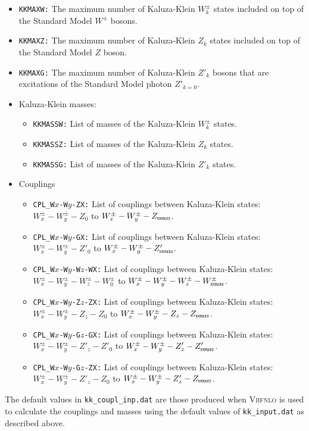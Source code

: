 \documentclass[english,12pt]{article}
\begin{document}
\begin{itemize}
 \item {\tt KKMAXW:} The maximum number of Kaluza-Klein $W^\pm_k$ states 
included on top of the Standard Model $W^\pm$ bosons.
 \item {\tt KKMAXZ:} The maximum number of Kaluza-Klein $Z_k$ states 
included on top of the Standard Model $Z$ boson.
 \item {\tt KKMAXG:} The maximum number of Kaluza-Klein $Z'_k$ bosons that are
excitations of the Standard Model photon $Z'_{k=0}$.
 \item Kaluza-Klein masses:
   \begin{itemize}
    \item {\tt KKMASSW:} List of masses of the Kaluza-Klein $W^{\pm}_{k}$ states.
    \item {\tt KKMASSZ:} List of masses of the Kaluza-Klein $Z_{k}$ states.
    \item {\tt KKMASSG:} List of masses of the Kaluza-Klein $Z'_{k}$ states.
   \end{itemize}
 \item Couplings
   \begin{itemize}
    \item {\tt CPL\_W$x$-W$y$-ZX:} List of couplings between Kaluza-Klein
states: $W^{\pm}_{x}-W^{\pm}_{y}-Z_{0}$ to $W^{\pm}_{x}-W^{\pm}_{y}-Z_{\mbox{\tiny{\tt KKMAXZ}}}$.
    \item {\tt CPL\_W$x$-W$y$-GX:} List of couplings between Kaluza-Klein
states: $W^{\pm}_{x}-W^{\pm}_{y}-Z'_{0}$ to
$W^{\pm}_{x}-W^{\pm}_{y}-Z'_{\mbox{\tiny{\tt KKMAXG}}}$.
    \item {\tt CPL\_W$x$-W$y$-W$z$-WX:} List of couplings between Kaluza-Klein
states: $W^{\pm}_{x}-W^{\pm}_{y}-W^{\pm}_{z}-W^{\pm}_{0}$ to
$W^{\pm}_{x}-W^{\pm}_{y}-W^{\pm}_{z}-W^{\pm}_{\mbox{\tiny{\tt KKMAXW}}}$.
    \item {\tt CPL\_W$x$-W$y$-Z$z$-ZX:} List of couplings between Kaluza-Klein
states: $W^{\pm}_{x}-W^{\pm}_{y}-Z_{z}-Z_{0}$ to
$W^{\pm}_{x}-W^{\pm}_{y}-Z_{z}-Z_{\mbox{\tiny{\tt KKMAXZ}}}$.
    \item {\tt CPL\_W$x$-W$y$-G$z$-GX:} List of couplings between Kaluza-Klein
states: $W^{\pm}_{x}-W^{\pm}_{y}-Z'_{z}-Z'_{0}$ to
$W^{\pm}_{x}-W^{\pm}_{y}-Z'_{z}-Z'_{\mbox{\tiny{\tt KKMAXG}}}$.
    \item {\tt CPL\_W$x$-W$y$-G$z$-ZX:} List of couplings between Kaluza-Klein
states: $W^{\pm}_{x}-W^{\pm}_{y}-Z'_{z}-Z_{0}$ to
$W^{\pm}_{x}-W^{\pm}_{y}-Z'_{z}-Z_{\mbox{\tiny{\tt KKMAXZ}}}$.
   \end{itemize}
\end{itemize}
The default values in {\tt kk\_coupl\_inp.dat} are those produced when
\textsc{Vbfnlo} is used to calculate the couplings and masses using the default
values of {\tt kk\_input.dat} as described above.
\end{document}
